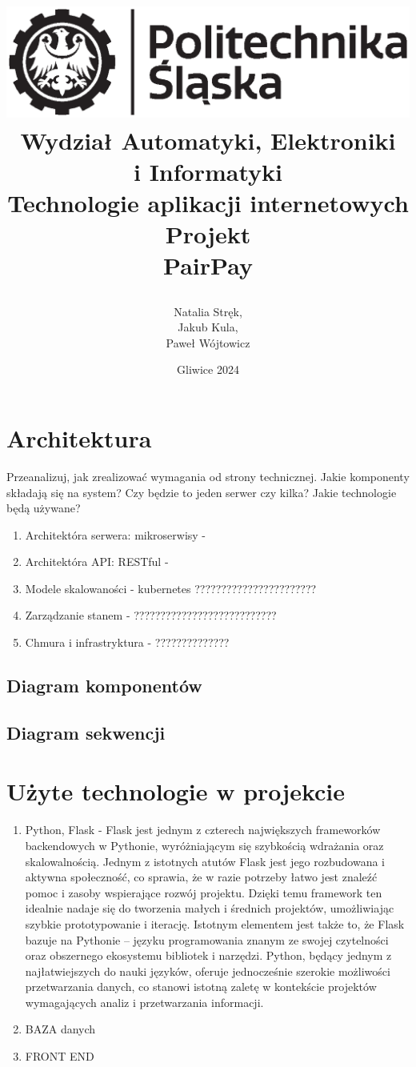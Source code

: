 \documentclass[12pt,titlepage]{article}
\title{
\includegraphics[scale=0.75]{img/politechnika_sl_logo_bw_poziom_pl.eps}\\
\textbf{Wydział Automatyki, Elektroniki\\
i Informatyki}\\
\vspace*{1cm}
Technologie aplikacji internetowych \\ Projekt \\ PairPay

\vspace*{5cm}
}
\author{
Natalia Stręk,\\
Jakub Kula,\\
Paweł Wójtowicz
}
\date{Gliwice 2024}
\begin{document}
\maketitle
\newpage
\section{Architektura}
Przeanalizuj, jak zrealizować wymagania od strony technicznej. Jakie komponenty składają się na system? Czy będzie to jeden serwer czy kilka? Jakie technologie będą używane?
\begin{enumerate}
    \item Architektóra serwera: mikroserwisy -
    \item Architektóra API: RESTful - 
    \item Modele skalowaności - kubernetes ???????????????????????
    \item Zarządzanie stanem - ???????????????????????????
    \item Chmura i infrastryktura - ??????????????
\end{enumerate}

\subsection{Diagram komponentów}
\subsection{Diagram sekwencji}
\section{Użyte technologie w projekcie}
\begin{enumerate}
    \item Python, Flask - Flask jest jednym z czterech największych frameworków backendowych w Pythonie, wyróżniającym się szybkością wdrażania oraz skalowalnością. Jednym z istotnych atutów Flask jest jego rozbudowana i aktywna społeczność, co sprawia, że w razie potrzeby łatwo jest znaleźć pomoc i zasoby wspierające rozwój projektu. Dzięki temu framework ten idealnie nadaje się do tworzenia małych i średnich projektów, umożliwiając szybkie prototypowanie i iterację. Istotnym elementem jest także to, że Flask bazuje na Pythonie – języku programowania znanym ze swojej czytelności oraz obszernego ekosystemu bibliotek i narzędzi. Python, będący jednym z najłatwiejszych do nauki języków, oferuje jednocześnie szerokie możliwości przetwarzania danych, co stanowi istotną zaletę w kontekście projektów wymagających analiz i przetwarzania informacji.
    \item BAZA danych
    \item FRONT END
\end{enumerate}
\end{document}
